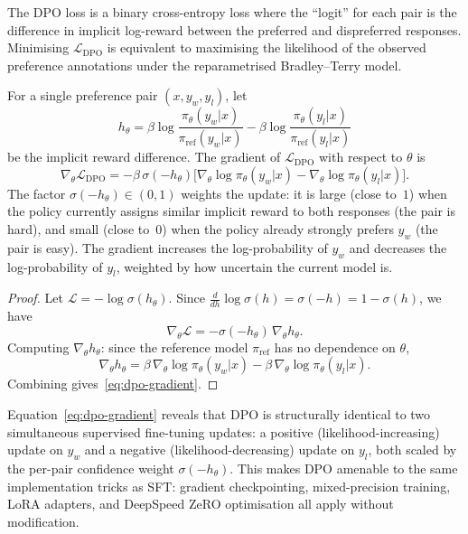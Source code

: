 The DPO loss is a binary cross-entropy loss where the ``logit'' for each pair is the difference in implicit log-reward between the preferred and dispreferred responses. Minimising $\mathcal{L}_\mathrm{DPO}$ is equivalent to maximising the likelihood of the observed preference annotations under the reparametrised Bradley--Terry model.

\begin{proposition}
\label{prop:dpo-gradient}
For a single preference pair $(x, y_w, y_l)$, let
\[
h_\theta = \beta\log\frac{\pi_\theta(y_w|x)}{\pi_\mathrm{ref}(y_w|x)}
         - \beta\log\frac{\pi_\theta(y_l|x)}{\pi_\mathrm{ref}(y_l|x)}
\]
be the implicit reward difference. The gradient of $\mathcal{L}_\mathrm{DPO}$ with respect to $\theta$ is
\begin{equation}
\label{eq:dpo-gradient}
\nabla_\theta \mathcal{L}_\mathrm{DPO}
= -\beta\,\sigma(-h_\theta)\bigl[
  \nabla_\theta\log\pi_\theta(y_w|x)
  - \nabla_\theta\log\pi_\theta(y_l|x)
\bigr].
\end{equation}
The factor $\sigma(-h_\theta) \in (0,1)$ weights the update: it is large (close to~$1$) when the policy currently assigns similar implicit reward to both responses (the pair is hard), and small (close to~$0$) when the policy already strongly prefers $y_w$ (the pair is easy). The gradient increases the log-probability of $y_w$ and decreases the log-probability of $y_l$, weighted by how uncertain the current model is.
\end{proposition}

\begin{proof}
Let $\mathcal{L} = -\log\sigma(h_\theta)$. Since $\frac{d}{dh}\log\sigma(h) = \sigma(-h) = 1 - \sigma(h)$, we have
\[
\nabla_\theta \mathcal{L} = -\sigma(-h_\theta)\,\nabla_\theta h_\theta.
\]
Computing $\nabla_\theta h_\theta$: since the reference model $\pi_\mathrm{ref}$ has no dependence on $\theta$,
\[
\nabla_\theta h_\theta = \beta\,\nabla_\theta\log\pi_\theta(y_w|x) - \beta\,\nabla_\theta\log\pi_\theta(y_l|x).
\]
Combining gives~\eqref{eq:dpo-gradient}.
\end{proof}

\begin{remark}
\label{rem:dpo-sft}
Equation~\eqref{eq:dpo-gradient} reveals that DPO is structurally identical to two simultaneous supervised fine-tuning updates: a positive (likelihood-increasing) update on $y_w$ and a negative (likelihood-decreasing) update on $y_l$, both scaled by the per-pair confidence weight $\sigma(-h_\theta)$. This makes DPO amenable to the same implementation tricks as SFT: gradient checkpointing, mixed-precision training, LoRA adapters, and DeepSpeed ZeRO optimisation all apply without modification.
\end{remark}

